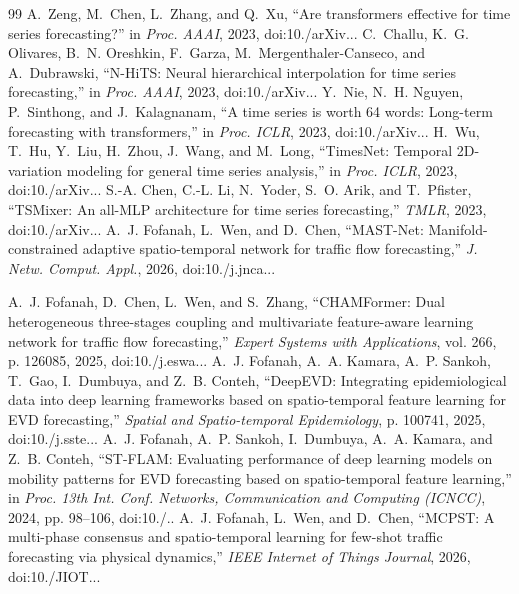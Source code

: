 \begin{thebibliography}{99}
 A.~Zeng, M.~Chen, L.~Zhang, and Q.~Xu, ``Are transformers effective for time series forecasting?'' in \emph{Proc. AAAI}, 2023, doi:10./\allowbreak arXiv...\allowbreak 
{} C.~Challu, K.~G. Olivares, B.~N. Oreshkin, F.~Garza, M.~Mergenthaler-Canseco, and A.~Dubrawski, ``N-HiTS: Neural hierarchical interpolation for time series forecasting,'' in \emph{Proc. AAAI}, 2023, doi:10./\allowbreak arXiv...\allowbreak 
{} Y.~Nie, N.~H. Nguyen, P.~Sinthong, and J.~Kalagnanam, ``A time series is worth 64 words: Long-term forecasting with transformers,'' in \emph{Proc. ICLR}, 2023, doi:10./\allowbreak arXiv...\allowbreak 
{} H.~Wu, T.~Hu, Y.~Liu, H.~Zhou, J.~Wang, and M.~Long, ``TimesNet: Temporal 2D-variation modeling for general time series analysis,'' in \emph{Proc. ICLR}, 2023, doi:10./\allowbreak arXiv...\allowbreak 
{} S.-A. Chen, C.-L. Li, N.~Yoder, S.~O. Arik, and T.~Pfister, ``TSMixer: An all-MLP architecture for time series forecasting,'' \emph{TMLR}, 2023, doi:10./\allowbreak arXiv...\allowbreak 
{} A.~J. Fofanah, L.~Wen, and D.~Chen, ``MAST-Net: Manifold-constrained adaptive spatio-temporal network for traffic flow forecasting,'' \emph{J. Netw. Comput. Appl.}, 2026, doi:10./\allowbreak j.\allowbreak jnca...\allowbreak 

 A.~J. Fofanah, D.~Chen, L.~Wen, and S.~Zhang, ``CHAMFormer: Dual heterogeneous three-stages coupling and multivariate feature-aware learning network for traffic flow forecasting,'' \emph{Expert Systems with Applications}, vol. 266, p. 126085, 2025, doi:10./\allowbreak j.\allowbreak eswa...\allowbreak 
{} A.~J. Fofanah, A.~A. Kamara, A.~P. Sankoh, T.~Gao, I.~Dumbuya, and Z.~B. Conteh, ``DeepEVD: Integrating epidemiological data into deep learning frameworks based on spatio-temporal feature learning for EVD forecasting,'' \emph{Spatial and Spatio-temporal Epidemiology}, p. 100741, 2025, doi:10./\allowbreak j.\allowbreak sste...\allowbreak 
{} A.~J. Fofanah, A.~P. Sankoh, I.~Dumbuya, A.~A. Kamara, and Z.~B. Conteh, ``ST-FLAM: Evaluating performance of deep learning models on mobility patterns for EVD forecasting based on spatio-temporal feature learning,'' in \emph{Proc. 13th Int. Conf. Networks, Communication and Computing (ICNCC)}, 2024, pp. 98--106, doi:10./..\allowbreak 
{} A.~J. Fofanah, L.~Wen, and D.~Chen, ``MCPST: A multi-phase consensus and spatio-temporal learning for few-shot traffic forecasting via physical dynamics,'' \emph{IEEE Internet of Things Journal}, 2026, doi:10./\allowbreak JIOT...\allowbreak 


\end{thebibliography}

